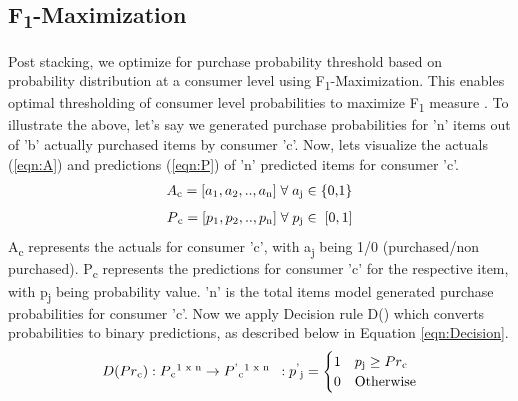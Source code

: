 \subsection{F\textsubscript{1}-Maximization}
Post stacking, we optimize for purchase probability threshold based on
probability distribution at a consumer level using F\textsubscript{1}-Maximization.
This enables optimal thresholding of consumer level probabilities to  maximize F\textsubscript{1} measure \cite{lipton2014optimal}.
To illustrate the above, let's say we generated purchase probabilities for 
'n' items out of 'b' actually purchased items by consumer 'c'. Now, lets visualize the actuals (\ref{eqn:A}) 
and predictions (\ref{eqn:P})  of 'n' predicted items for consumer 'c'.
  \begin{equation}
    \begin{array}{l}
      A\textsubscript{c} = [a\textsubscript{1}, a\textsubscript{2}, .., a\textsubscript{n}] 
       \; \forall \; a\textsubscript{j} \in \; $\{0,1\}$
    \end{array}
    \label{eqn:A}
  \end{equation}
  \begin{equation}
    \begin{array}{l}
      P\textsubscript{c} = [p\textsubscript{1}, p\textsubscript{2}, .., p\textsubscript{n}]
      \; \forall \; p\textsubscript{j} \in \; [0,1]
    \end{array}
    \label{eqn:P}
  \end{equation}
A\textsubscript{c} represents the actuals for consumer 'c', with a\textsubscript{j} being 1/0 
(purchased/non purchased). P\textsubscript{c} represents the predictions 
for consumer 'c' for the respective item, with p\textsubscript{j} being probability value. 
'n' is the total items model generated purchase probabilities for consumer 'c'.
Now we apply Decision rule D() which converts probabilities to binary predictions, as described below 
in Equation \ref{eqn:Decision}.
  \begin{equation}
    \begin{array}{l}
      D(Pr\textsubscript{c}) : P\textsubscript{c}\textsuperscript{1 x n}
      \to P\textsuperscript{'}\textsubscript{c}\textsuperscript{1 x n}
      \;\; : p\textsuperscript{'}\textsubscript{j} = 
        \begin{cases}
          1 & p\textsubscript{j} \geq Pr\textsubscript{c} \\
          0 & \text{Otherwise}
        \end{cases}
    \end{array}
    \label{eqn:Decision}
  \end{equation}
